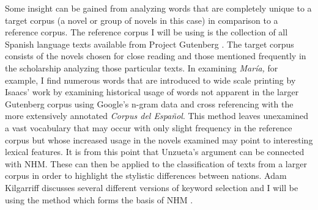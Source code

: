 \documentclass[12pt]{report}
\begin{document}
Some insight can be gained from analyzing words that are completely unique to a target corpus (a novel or group of novels in this case) in comparison to a reference corpus. The reference corpus I will be using is the collection of all Spanish language texts available from Project Gutenberg \autocite{Gutenberg2015}. 
The target corpus consists of the novels chosen for close reading and those mentioned frequently in the scholarship analyzing those particular texts. In examining \textit{María,} for example, I find numerous words that are introduced to wide scale printing by Isaacs' work by examining historical usage of words not apparent in the larger Gutenberg corpus using Google's n-gram data and cross referencing with the more extensively annotated \textit{Corpus del Español}\nocite{Michel2011, Davies2012}. 
This method leaves unexamined a vast vocabulary that may occur with only slight frequency in the reference corpus but whose increased usage in the novels examined may point to interesting lexical features. 
It is from this point that Unzueta's argument can be connected with NHM. 
These can then be applied to the classification of texts from a larger corpus in order to highlight the stylistic differences between nations. Adam Kilgarriff discusses several different versions of keyword selection and I will be using the method which forms the basis of NHM \nocite{Kilgarriff}. 



\end{document}
